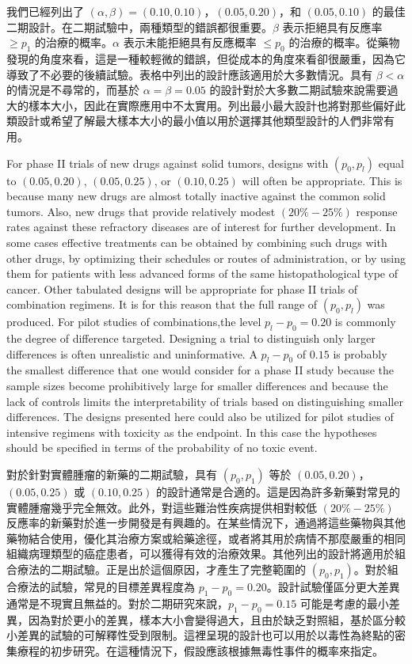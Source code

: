 	我們已經列出了 $(\alpha, \beta) = (0.10, 0.10)$，$(0.05, 0.20)$，和 $(0.05, 0.10)$ 的最佳二期設計。在二期試驗中，兩種類型的錯誤都很重要。$\beta$ 表示拒絕具有反應率 $\geq p_1$ 的治療的概率。$\alpha$ 表示未能拒絕具有反應概率 $\leq p_0$ 的治療的概率。從藥物發現的角度來看，這是一種較輕微的錯誤，但從成本的角度來看卻很嚴重，因為它導致了不必要的後續試驗。表格中列出的設計應該適用於大多數情況。具有 $ \beta < \alpha $ 的情況是不尋常的，而基於 $ \alpha = \beta = 0.05 $ 的設計對於大多數二期試驗來說需要過大的樣本大小，因此在實際應用中不太實用。列出最小最大設計也將對那些偏好此類設計或希望了解最大樣本大小的最小值以用於選擇其他類型設計的人們非常有用。

	For phase II trials of new drugs against solid tumors, designs with $(p_0,p_l)$ equal to $(0.05,0.20)$, $(0.05,0.25)$, or $(0.10,0.25)$ will often be appropriate. This is because many new drugs are almost totally inactive against the common solid tumors. Also, new drugs that provide relatively modest $(20\%-25\%)$ response rates against these refractory diseases are of interest for further development. In some cases effective treatments can be obtained by combining such drugs with other drugs, by optimizing their schedules or routes of administration, or by using them for patients with less advanced forms of the same histopathological type of cancer. Other tabulated designs will be appropriate for phase II trials of combination regimens. It is for this reason that the full range of $(p_0,p_l)$ was produced. For pilot studies of combinations,the level $p_l - p_0 = 0.20$ is commonly the degree of difference targeted. Designing a trial to distinguish only larger differences is often unrealistic and uninformative. A $p_l - p_0$ of $0.15$ is probably the smallest difference that one would consider for a phase II study because the sample sizes become prohibitively large for smaller differences and because the lack of controls limits the interpretability of trials based on distinguishing smaller differences. The designs presented here could also be utilized for pilot studies of intensive regimens with toxicity as the endpoint. In this case the hypotheses should be specified in terms of the probability of no toxic event. 

	對於針對實體腫瘤的新藥的二期試驗，具有 $(p_0, p_1)$ 等於 $(0.05, 0.20)$，$(0.05, 0.25)$ 或 $(0.10, 0.25)$ 的設計通常是合適的。這是因為許多新藥對常見的實體腫瘤幾乎完全無效。此外，對這些難治性疾病提供相對較低 $(20\%-25\%)$ 反應率的新藥對於進一步開發是有興趣的。在某些情況下，通過將這些藥物與其他藥物結合使用，優化其治療方案或給藥途徑，或者將其用於病情不那麼嚴重的相同組織病理類型的癌症患者，可以獲得有效的治療效果。其他列出的設計將適用於組合療法的二期試驗。正是出於這個原因，才產生了完整範圍的 $(p_0, p_1)$。對於組合療法的試驗，常見的目標差異程度為 $p_1 - p_0 = 0.20$。設計試驗僅區分更大差異通常是不現實且無益的。對於二期研究來說，$p_1 - p_0 = 0.15$ 可能是考慮的最小差異，因為對於更小的差異，樣本大小會變得過大，且由於缺乏對照組，基於區分較小差異的試驗的可解釋性受到限制。這裡呈現的設計也可以用於以毒性為終點的密集療程的初步研究。在這種情況下，假設應該根據無毒性事件的概率來指定。

